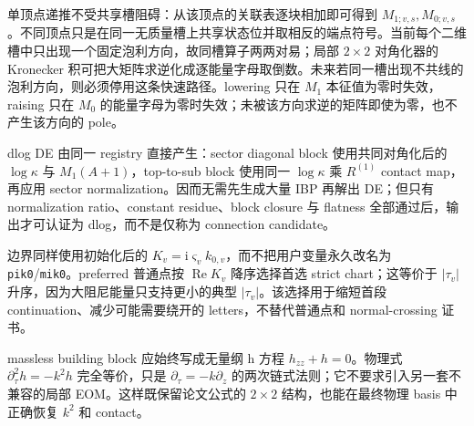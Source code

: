 \documentclass[11pt,a4paper]{ctexart}
\newcommand{\ii}{\mathrm i}
\begin{document}
单顶点递推不受共享槽阻碍：从该顶点的关联表逐块相加即可得到 $M_{1;v,s},M_{0;v,s}$。不同顶点只是在同一无质量槽上共享状态位并取相反的端点符号。当前每个二维槽中只出现一个固定泡利方向，故同槽算子两两对易；局部 $2\times2$ 对角化器的 Kronecker 积可把大矩阵求逆化成逐能量字母取倒数。未来若同一槽出现不共线的泡利方向，则必须停用这条快速路径。lowering 只在 $M_1$ 本征值为零时失效，raising 只在 $M_0$ 的能量字母为零时失效；未被该方向求逆的矩阵即使为零，也不产生该方向的 pole。

dlog DE 由同一 registry 直接产生：sector diagonal block 使用共同对角化后的 $\log\kappa$ 与 $M_1(A+1)$，top-to-sub block 使用同一 $\log\kappa$ 乘 $R^{(1)}$ contact map，再应用 sector normalization。因而无需先生成大量 IBP 再解出 DE；但只有 normalization ratio、constant residue、block closure 与 flatness 全部通过后，输出才可认证为 dlog，而不是仅称为 connection candidate。

边界同样使用初始化后的 $K_v=\ii\varsigma_vk_{0,v}$，而不把用户变量永久改名为 \texttt{pik0}/\texttt{mik0}。preferred 普通点按 $\operatorname{Re}K_v$ 降序选择首选 strict chart；这等价于 $|\tau_v|$ 升序，因为大阻尼能量只支持更小的典型 $|\tau_v|$。该选择用于缩短首段 continuation、减少可能需要绕开的 letters，不替代普通点和 normal-crossing 证书。

massless building block 应始终写成无量纲 h 方程 $h_{zz}+h=0$。物理式 $\partial_\tau^2h=-k^2h$ 完全等价，只是 $\partial_\tau=-k\partial_z$ 的两次链式法则；它不要求引入另一套不兼容的局部 EOM。这样既保留论文公式的 $2\times2$ 结构，也能在最终物理 basis 中正确恢复 $k^2$ 和 contact。



\end{document}
